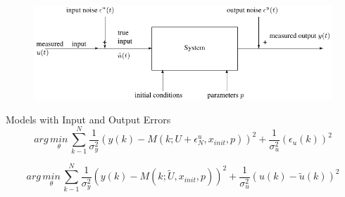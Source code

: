 \begin{tcolorbox}[colback=green!5!white,colframe=green!75!black,title=Dynamic Models]
\begin{figure}[H]
	\centering
  	\includegraphics[width=\linewidth]{./model.pdf}
	\label{model}
\end{figure}
Models with Input and Output Errors
\begin{equation*}
arg \, \underset { \theta  }{ min } \, \sum _{ k-1 }^{ N }{ \frac { 1 }{ { \sigma  }_{ y }^{ 2 } }  } { (y(k)-M(k;U+{ \epsilon  }_{ N }^{ u },{ x }_{ init },p)) }^{ 2 }+\frac { 1 }{ { \sigma  }_{ u }^{ 2 } } { ({ \epsilon  }_{ u }(k)) }^{ 2 }
\end{equation*}


\begin{equation*}
arg \, \underset { \theta  }{ min } \, \sum _{ k-1 }^{ N }{ \frac { 1 }{ { \sigma  }_{ y }^{ 2 } }  } { (y(k)-M(k;\tilde { U } ,{ x }_{ init },p)) }^{ 2 }+\frac { 1 }{ { \sigma  }_{ u }^{ 2 } } { (u(k)-\tilde{ u }(k) ) }^{ 2 }
\end{equation*}
\end{tcolorbox}